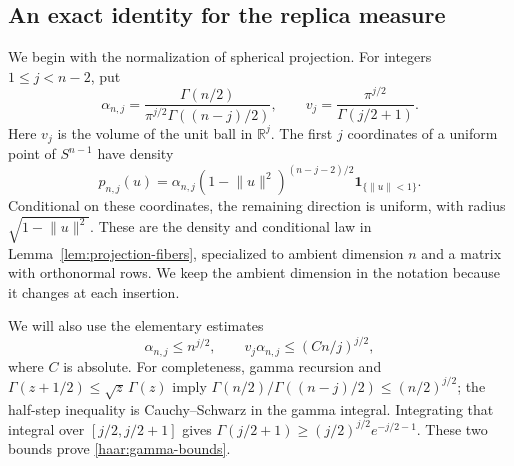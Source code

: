 \subsection{An exact identity for the replica measure}

We begin with the normalization of spherical projection.  For integers
$1\le j<n-2$, put
\[
 \alpha_{n,j}=\frac{\Gamma(n/2)}{\pi^{j/2}\Gamma((n-j)/2)},
 \qquad v_j=\frac{\pi^{j/2}}{\Gamma(j/2+1)}.
\]
Here $v_j$ is the volume of the unit ball in $\mathbb R^j$.  The first
$j$ coordinates of a uniform point of $S^{n-1}$ have density
\begin{equation}\label{haar:sphere-density}
 p_{n,j}(u)=\alpha_{n,j}(1-\lVert u\rVert^2)^{(n-j-2)/2}
            \mathbf 1_{\{\lVert u\rVert<1\}}.
\end{equation}
Conditional on these coordinates, the remaining direction is uniform,
with radius $\sqrt{1-\lVert u\rVert^2}$.  These are the density and
conditional law in Lemma~\ref{lem:projection-fibers}, specialized to
ambient dimension $n$ and a matrix with orthonormal rows.  We keep the
ambient dimension in the notation because it changes at each insertion.

We will also use the elementary estimates
\begin{equation}\label{haar:gamma-bounds}
 \alpha_{n,j}\le n^{j/2},\qquad
 v_j\alpha_{n,j}\le (Cn/j)^{j/2},
\end{equation}
where $C$ is absolute.  For completeness, gamma recursion and
$\Gamma(z+1/2)\le\sqrt z\,\Gamma(z)$ imply
$\Gamma(n/2)/\Gamma((n-j)/2)\le(n/2)^{j/2}$; the half-step inequality
is Cauchy--Schwarz in the gamma integral.  Integrating that integral over
$[j/2,j/2+1]$ gives
$\Gamma(j/2+1)\ge(j/2)^{j/2}e^{-j/2-1}$.  These two bounds prove
\eqref{haar:gamma-bounds}.

